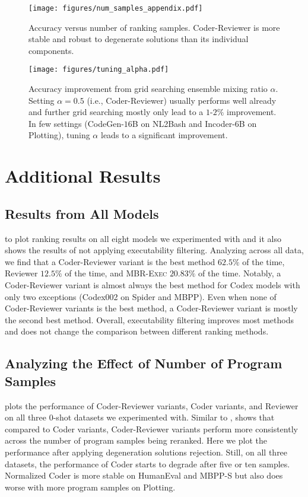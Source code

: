 \documentclass[nohyperref]{article}
\theoremstyle{plain}
\theoremstyle{definition}
\theoremstyle{remark}
\begin{document}
\begin{figure*}[ht!]
     \centering
     \texttt{[image: figures/num\_samples\_appendix.pdf]}
     \caption{Accuracy versus number of ranking samples. Coder-Reviewer is more stable and robust to degenerate solutions than its individual components.}
     \label{fig:num_examples_appendix}
     \vspace{-5pt}
\end{figure*}

\begin{figure*}[ht!]
     \centering
     \texttt{[image: figures/tuning\_alpha.pdf]}
     \caption{Accuracy improvement from grid searching ensemble mixing ratio $\alpha$. Setting $\alpha=0.5$ (i.e., Coder-Reviewer) usually performs well already and further grid searching mostly only lead to a $1$-$2\%$ improvement. In few settings (CodeGen-$16$B on NL2Bash and Incoder-$6$B on Plotting), tuning $\alpha$ leads to a significant improvement.}
     \label{fig:tuning_alpha}
     \vspace{-5pt}
\end{figure*}

\section{Additional Results}
\label{sec:app-results}
\subsection{Results from All Models}
\label{sec:app-all-results}
 to  plot ranking results on all eight models we experimented with and it also shows the results of not applying executability filtering.
Analyzing across all data, we find that a Coder-Reviewer variant is the best method $62.5\%$ of the time, Reviewer $12.5\%$ of the time, and MBR-\textsc{Exec} $20.83\%$ of the time.
Notably, a Coder-Reviewer variant is almost always the best method for Codex models with only two exceptions (Codex002 on Spider and MBPP).
Even when none of Coder-Reviewer variants is the best method, a Coder-Reviewer variant is mostly the second best method.
Overall, executability filtering improves most methods and does not change the comparison between different ranking methods.

\subsection{Analyzing the Effect of Number of Program Samples}
\label{sec:app-samples}
 plots the performance of Coder-Reviewer variants, Coder variants, and Reviewer on all three 0-shot datasets we experimented with.
Similar to ,  shows that compared to Coder variants, Coder-Reviewer variants perform more consistently across the number of program samples being reranked.
Here we plot the performance after applying degeneration solutions rejection.
Still, on all three datasets, the performance of Coder starts to degrade after five or ten samples.
Normalized Coder is more stable on HumanEval and MBPP-S but also does worse with more program samples on Plotting.
\end{document}
